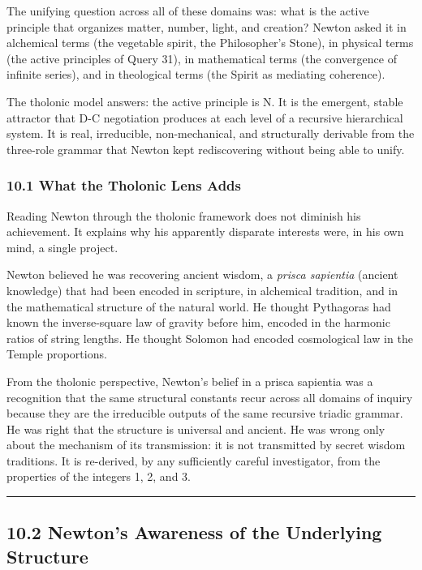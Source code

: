 \documentclass[
  11pt,
  letterpaper,
]{article}
\begin{document}
The unifying question across all of these domains was: what is the
active principle that organizes matter, number, light, and creation?
Newton asked it in alchemical terms (the vegetable spirit, the
Philosopher's Stone), in physical terms (the active principles of Query
31), in mathematical terms (the convergence of infinite series), and in
theological terms (the Spirit as mediating coherence).

The tholonic model answers: the active principle is N. It is the
emergent, stable attractor that D-C negotiation produces at each level
of a recursive hierarchical system. It is real, irreducible,
non-mechanical, and structurally derivable from the three-role grammar
that Newton kept rediscovering without being able to unify.

\subsubsection{10.1 What the Tholonic Lens
Adds}\label{what-the-tholonic-lens-adds}

Reading Newton through the tholonic framework does not diminish his
achievement. It explains why his apparently disparate interests were, in
his own mind, a single project.

Newton believed he was recovering ancient wisdom, a \emph{prisca
sapientia} (ancient knowledge) that had been encoded in scripture, in
alchemical tradition, and in the mathematical structure of the natural
world. He thought Pythagoras had known the inverse-square law of gravity
before him, encoded in the harmonic ratios of string lengths. He thought
Solomon had encoded cosmological law in the Temple proportions.

From the tholonic perspective, Newton's belief in a prisca sapientia was
a recognition that the same structural constants recur across all
domains of inquiry because they are the irreducible outputs of the same
recursive triadic grammar. He was right that the structure is universal
and ancient. He was wrong only about the mechanism of its transmission:
it is not transmitted by secret wisdom traditions. It is re-derived, by
any sufficiently careful investigator, from the properties of the
integers 1, 2, and 3.

\begin{center}\rule{0.5\linewidth}{0.5pt}\end{center}

\subsection{10.2 Newton's Awareness of the Underlying
Structure}\label{newtons-awareness-of-the-underlying-structure}
\end{document}
